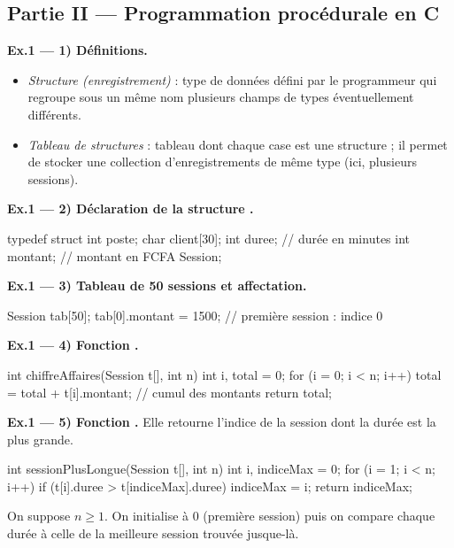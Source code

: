 \subsection*{Partie II — Programmation procédurale en C}

\textbf{Ex.1 — 1) Définitions.}
\begin{itemize}
\item \emph{Structure (enregistrement)} : type de données défini par le
programmeur qui regroupe sous un même nom plusieurs champs de types éventuellement
différents.
\item \emph{Tableau de structures} : tableau dont chaque case est une structure ;
il permet de stocker une collection d'enregistrements de même type (ici, plusieurs
sessions).
\end{itemize}

\textbf{Ex.1 — 2) Déclaration de la structure .}

\begin{codec}
typedef struct {
    int  poste;
    char client[30];
    int  duree;     // durée en minutes
    int  montant;   // montant en FCFA
} Session;
\end{codec}

\textbf{Ex.1 — 3) Tableau de 50 sessions et affectation.}

\begin{codec}
Session tab[50];
tab[0].montant = 1500;   // première session : indice 0
\end{codec}

\textbf{Ex.1 — 4) Fonction .}

\begin{codec}
int chiffreAffaires(Session t[], int n) {
    int i, total = 0;
    for (i = 0; i < n; i++) {
        total = total + t[i].montant;   // cumul des montants
    }
    return total;
}
\end{codec}

\textbf{Ex.1 — 5) Fonction .} Elle retourne l'indice de la
session dont la durée est la plus grande.

\begin{codec}
int sessionPlusLongue(Session t[], int n) {
    int i, indiceMax = 0;
    for (i = 1; i < n; i++) {
        if (t[i].duree > t[indiceMax].duree) {
            indiceMax = i;
        }
    }
    return indiceMax;
}
\end{codec}

\begin{remarque}
On suppose $n \geq 1$. On initialise  à 0 (première session) puis
on compare chaque durée à celle de la meilleure session trouvée jusque-là.
\end{remarque}

